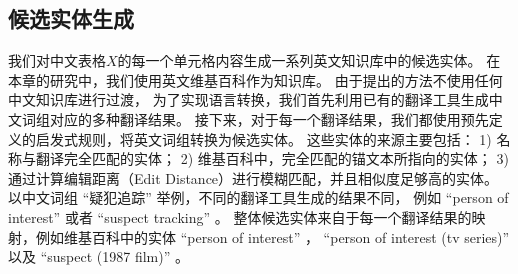 
\subsection{候选实体生成}
\label{sec:tabel-candgen}


我们对中文表格$X$的每一个单元格内容生成一系列英文知识库中的候选实体。
在本章的研究中，我们使用英文维基百科作为知识库。
由于提出的方法不使用任何中文知识库进行过渡，
为了实现语言转换，我们首先利用已有的翻译工具生成中文词组对应的多种翻译结果。
接下来，对于每一个翻译结果，我们都使用预先定义的启发式规则，将英文词组转换为候选实体。
这些实体的来源主要包括：
1) 名称与翻译完全匹配的实体；
2) 维基百科中，完全匹配的锚文本所指向的实体；
3) 通过计算编辑距离（Edit Distance）进行模糊匹配，并且相似度足够高的实体。
以中文词组 ``{疑犯追踪}'' 举例，不同的翻译工具生成的结果不同，
例如 ``person of interest'' 或者 ``suspect tracking'' 。
整体候选实体来自于每一个翻译结果的映射，例如维基百科中的实体
``person of interest'' ， ``person of interest (tv series)'' 以及 ``suspect (1987 film)'' 。

